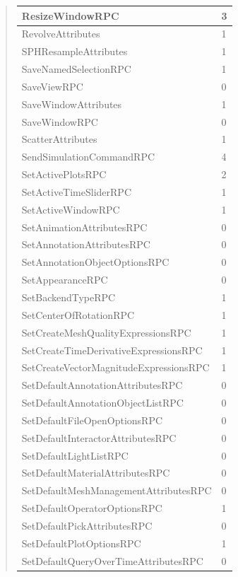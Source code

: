 \documentclass[letterpaper,10pt,english]{sphinxmanual}
\begin{document}
\begin{quote}
\begin{longtable}{|l|l|}
ResizeWindowRPC
 & 
3
\\
\hline
RevolveAttributes
 & 
1
\\
\hline
SPHResampleAttributes
 & 
1
\\
\hline
SaveNamedSelectionRPC
 & 
1
\\
\hline
SaveViewRPC
 & 
0
\\
\hline
SaveWindowAttributes
 & 
1
\\
\hline
SaveWindowRPC
 & 
0
\\
\hline
ScatterAttributes
 & 
1
\\
\hline
SendSimulationCommandRPC
 & 
4
\\
\hline
SetActivePlotsRPC
 & 
2
\\
\hline
SetActiveTimeSliderRPC
 & 
1
\\
\hline
SetActiveWindowRPC
 & 
1
\\
\hline
SetAnimationAttributesRPC
 & 
0
\\
\hline
SetAnnotationAttributesRPC
 & 
0
\\
\hline
SetAnnotationObjectOptionsRPC
 & 
0
\\
\hline
SetAppearanceRPC
 & 
0
\\
\hline
SetBackendTypeRPC
 & 
1
\\
\hline
SetCenterOfRotationRPC
 & 
1
\\
\hline
SetCreateMeshQualityExpressionsRPC
 & 
1
\\
\hline
SetCreateTimeDerivativeExpressionsRPC
 & 
1
\\
\hline
SetCreateVectorMagnitudeExpressionsRPC
 & 
1
\\
\hline
SetDefaultAnnotationAttributesRPC
 & 
0
\\
\hline
SetDefaultAnnotationObjectListRPC
 & 
0
\\
\hline
SetDefaultFileOpenOptionsRPC
 & 
0
\\
\hline
SetDefaultInteractorAttributesRPC
 & 
0
\\
\hline
SetDefaultLightListRPC
 & 
0
\\
\hline
SetDefaultMaterialAttributesRPC
 & 
0
\\
\hline
SetDefaultMeshManagementAttributesRPC
 & 
0
\\
\hline
SetDefaultOperatorOptionsRPC
 & 
1
\\
\hline
SetDefaultPickAttributesRPC
 & 
0
\\
\hline
SetDefaultPlotOptionsRPC
 & 
1
\\
\hline
SetDefaultQueryOverTimeAttributesRPC
 & 
0
\\

\end{longtable}
\end{quote}
\end{document}
